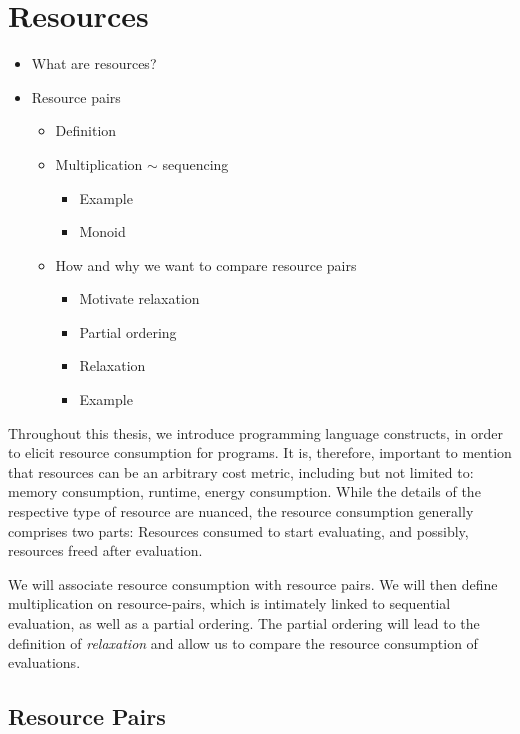 \chapter{Resources}

\begin{itemize}
   \item What are resources?
   \item Resource pairs
      \begin{itemize}
         \item Definition
         \item Multiplication \(\sim\) sequencing
         \begin{itemize}
            \item Example
            \item Monoid
         \end{itemize}
      \item How and why we want to compare resource pairs
         \begin{itemize}
            \item Motivate relaxation
            \item Partial ordering
            \item Relaxation
            \item Example
         \end{itemize}
      \end{itemize}
\end{itemize}

Throughout this thesis, we introduce programming language constructs, in order to elicit resource consumption for programs. It is, therefore, important to mention that resources can be an arbitrary cost metric, including but not limited to: memory consumption, runtime, energy consumption. While the details of the respective type of resource are nuanced, the resource consumption generally comprises two parts: Resources consumed to start evaluating, and possibly, resources freed after evaluation.

We will associate resource consumption with resource pairs. We will then define multiplication on resource-pairs, which is intimately linked to sequential evaluation, as well as a partial ordering. The partial ordering will lead to the definition of \emph{relaxation} and allow us to compare the resource consumption of evaluations. 

\section{Resource Pairs}

